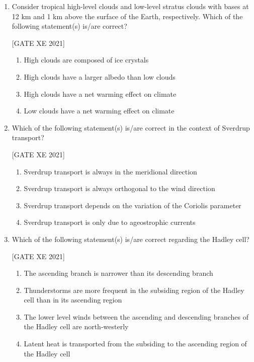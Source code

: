 \documentclass[journal,12pt,onecolumn]{IEEEtran}
\theoremstyle{remark}
\begin{document}
\begin{enumerate}[resume]
\item Consider tropical high-level clouds and low-level stratus clouds with bases at 12 km and 1 km above the surface of the Earth, respectively. Which of the following statement(s) is/are correct?

\hfill[GATE XE 2021]

\begin{multicols}{2}
\begin{enumerate}
\item High clouds are composed of ice crystals
\item High clouds have a larger albedo than low clouds
\item High clouds have a net warming effect on climate
\item Low clouds have a net warming effect on climate
\end{enumerate}
\end{multicols}


\item Which of the following statement(s) is/are correct in the context of Sverdrup transport?

\hfill[GATE XE 2021]

\begin{multicols}{2}
\begin{enumerate}
\item Sverdrup transport is always in the meridional direction
\item Sverdrup transport is always orthogonal to the wind direction
\item Sverdrup transport depends on the variation of the Coriolis parameter
\item Sverdrup transport is only due to ageostrophic currents
\end{enumerate}
\end{multicols}
\item Which of the following statement(s) is/are correct regarding the Hadley cell?

\hfill[GATE XE 2021]

\begin{multicols}{2}
\begin{enumerate}
\item The ascending branch is narrower than its descending branch
\item Thunderstorms are more frequent in the subsiding region of the Hadley cell than in its ascending region
\item The lower level winds between the ascending and descending branches of the Hadley cell are north-westerly
\item Latent heat is transported from the subsiding to the ascending region of the Hadley cell
\end{enumerate}
\end{multicols}



\end{enumerate}
\end{document}
